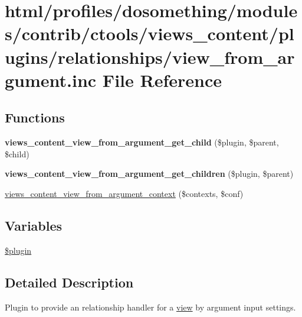 \hypertarget{view__from__argument_8inc}{
\section{html/profiles/dosomething/modules/contrib/ctools/views\_\-content/plugins/relationships/view\_\-from\_\-argument.inc File Reference}
\label{view__from__argument_8inc}
}
\subsection*{Functions}
\begin{DoxyCompactItemize}
\item 
\hypertarget{view__from__argument_8inc_adfd5a782583c4a7695202ecef24aca9b}{
{\bfseries views\_\-content\_\-view\_\-from\_\-argument\_\-get\_\-child} (\$plugin, \$parent, \$child)}
\label{view__from__argument_8inc_adfd5a782583c4a7695202ecef24aca9b}

\item 
\hypertarget{view__from__argument_8inc_a6d7b03b8a9fce825fe1c3dccf47de24f}{
{\bfseries views\_\-content\_\-view\_\-from\_\-argument\_\-get\_\-children} (\$plugin, \$parent)}
\label{view__from__argument_8inc_a6d7b03b8a9fce825fe1c3dccf47de24f}

\item 
\hyperlink{view__from__argument_8inc_af6e24ab3dba62e478692b5381dbfcafd}{views\_\-content\_\-view\_\-from\_\-argument\_\-context} (\$contexts, \$conf)
\end{DoxyCompactItemize}
\subsection*{Variables}
\begin{DoxyCompactItemize}
\item 
\hyperlink{view__from__argument_8inc_ada8a7130088351710bb02ed622d6bf65}{\$plugin}
\end{DoxyCompactItemize}


\subsection{Detailed Description}
Plugin to provide an relationship handler for a \hyperlink{classview}{view} by argument input settings. 

